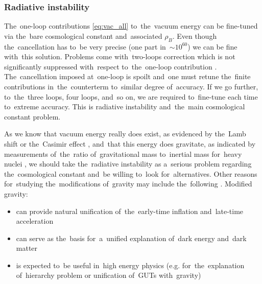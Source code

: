 \subsubsection{Radiative instability}
The~one-loop contributions \eqref{eq:vac_all} to~the~vacuum energy can be fine-tuned via the~bare cosmological constant and~associated $\rho_B$. Even though the~cancellation has to~be very precise (one part in~$\sim10^{60}$) we can be fine with~this solution. Problems come with~two-loops correction which is not significantly suppressed with~respect to~the~one-loop contribution \parencite{2012CRPhy..13..566M}. The~cancellation imposed at~one-loop is spoilt and~one must retune the~finite contributions in~the~counterterm to~similar degree of~accuracy. If we go further, to~the~three loops, four loops, and~so on, we are required to~fine-tune each time to~extreme accuracy. This is radiative instability and~the~main cosmological constant problem.

As we know that vacuum energy really does exist, as evidenced by the~Lamb shift \parencite{2020Physi...2..105M} or the~Casimir effect \parencite{2006BrJPh..36.1137F}, and~that this energy does gravitate, as indicated by measurements of~the~ratio of~gravitational mass to~inertial mass for~heavy nuclei \parencite{Braginskii:1971tn}, we should take the~radiative instability as a~serious problem regarding the~cosmological constant and~be willing to~look for~alternatives. Other reasons for~studying the~modifications of~gravity may include the~following \parencite{2006hep.th....1213N}. Modified gravity:
\begin{itemize}
	\item can provide natural unification of~the~early-time inflation and~late-time acceleration
	\item can serve as the~basis for~a~unified explanation of~dark energy and~dark matter
	\item is expected to~be useful in~high energy physics (e.g. for~the~explanation of~hierarchy problem or unification of~GUTs with~gravity)
\end{itemize} 
